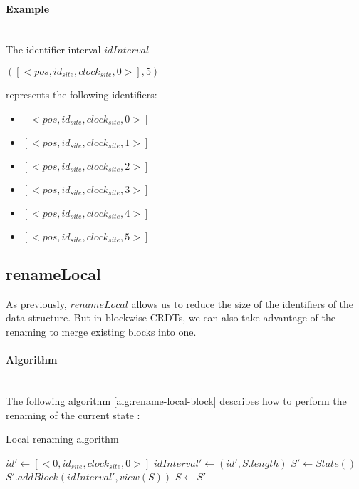 \documentclass[a4paper]{article}
\begin{document}
\paragraph{Example}~\\

The identifier interval $idInterval$
\begin{center}
  $([<pos, id_{site}, clock_{site}, 0>], 5)$
\end{center}
represents the following identifiers:
\begin{itemize}
  \item $[<pos, id_{site}, clock_{site}, 0>]$
  \item $[<pos, id_{site}, clock_{site}, 1>]$
  \item $[<pos, id_{site}, clock_{site}, 2>]$
  \item $[<pos, id_{site}, clock_{site}, 3>]$
  \item $[<pos, id_{site}, clock_{site}, 4>]$
  \item $[<pos, id_{site}, clock_{site}, 5>]$
\end{itemize}

\subsection{renameLocal}

As previously, $renameLocal$ allows us to reduce the size of the identifiers
of the data structure. But in blockwise \acp{CRDT}, we can also take advantage
of the renaming to merge existing blocks into one.

\paragraph{Algorithm}~\\

The following algorithm \ref{alg:rename-local-block} describes how to perform
the renaming of the current state :

\begin{algorithm}
  \caption{Local renaming algorithm}
  \label{alg:rename-local-block}
  \begin{algorithmic}
      \State $id' \gets [<0, id_{site}, clock_{site}, 0>]$
      \State $idInterval' \gets (id', S.length)$
      \State $S' \gets State()$
      \State $S'.addBlock(idInterval', view(S))$
      \State $S \gets S'$
    \EndProcedure
  \end{algorithmic}
\end{algorithm}
\end{document}

